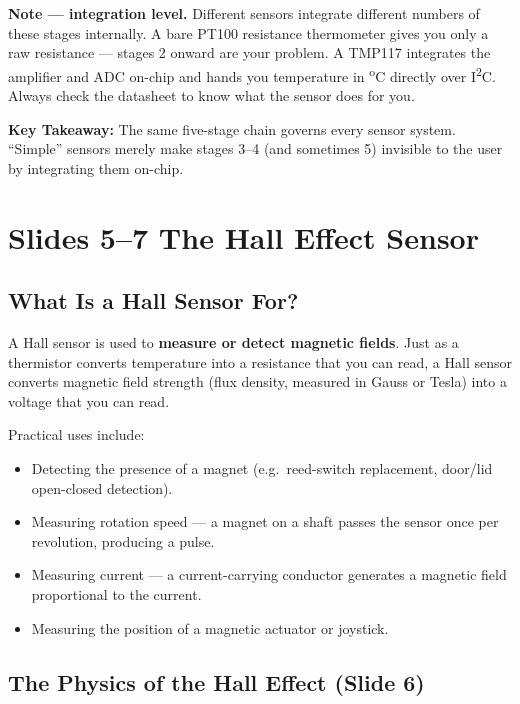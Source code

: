 \documentclass[12pt, a4paper]{article}
\begin{document}
\begin{notebox}
  \textbf{Note — integration level.} Different sensors integrate different
  numbers of these stages internally.  A bare PT100 resistance thermometer
  gives you only a raw resistance — stages 2 onward are your problem.
  A TMP117 integrates the amplifier and ADC on-chip and hands you
  temperature in \textsuperscript{o}C directly over I\textsuperscript{2}C.
  Always check the datasheet to know what the sensor does for you.
\end{notebox}

\begin{keybox}
  \textbf{Key Takeaway:} The same five-stage chain governs every sensor
  system.  ``Simple'' sensors merely make stages 3–4 (and sometimes 5)
  invisible to the user by integrating them on-chip.
\end{keybox}

\section*{Slides 5–7 \quad The Hall Effect Sensor}

\subsection*{What Is a Hall Sensor For?}

A Hall sensor is used to \textbf{measure or detect magnetic fields}.
Just as a thermistor converts temperature into a resistance that you can
read, a Hall sensor converts magnetic field strength (flux density,
measured in Gauss or Tesla) into a voltage that you can read.

Practical uses include:
\begin{itemize}[leftmargin=1.5em]
  \item Detecting the presence of a magnet (e.g.\ reed-switch replacement,
        door/lid open-closed detection).
  \item Measuring rotation speed — a magnet on a shaft passes the sensor
        once per revolution, producing a pulse.
  \item Measuring current — a current-carrying conductor generates a
        magnetic field proportional to the current.
  \item Measuring the position of a magnetic actuator or joystick.
\end{itemize}

\subsection*{The Physics of the Hall Effect (Slide 6)}
\end{document}
